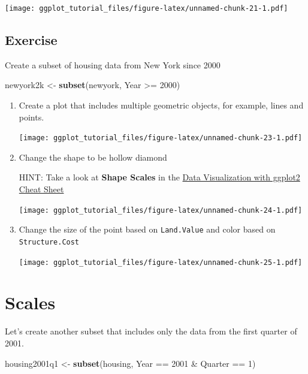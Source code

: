 \documentclass[]{article}
\newenvironment{Shaded}{\begin{snugshade}}{\end{snugshade}}
\newcommand{\KeywordTok}[1]{\textcolor[rgb]{0.13,0.29,0.53}{\textbf{{#1}}}}
\newcommand{\DecValTok}[1]{\textcolor[rgb]{0.00,0.00,0.81}{{#1}}}
\newcommand{\StringTok}[1]{\textcolor[rgb]{0.31,0.60,0.02}{{#1}}}
\newcommand{\NormalTok}[1]{{#1}}
\theoremstyle{definition}
\theoremstyle{definition}
\theoremstyle{definition}
\theoremstyle{remark}
\begin{document}
\texttt{[image: ggplot\_tutorial\_files/figure-latex/unnamed-chunk-21-1.pdf]}

\subsection{Exercise}\label{exercise-1}

Create a subset of housing data from New York since 2000

\begin{Shaded}
\begin{Highlighting}[]
\NormalTok{newyork2k <-}\StringTok{ }\KeywordTok{subset}\NormalTok{(newyork, Year >=}\StringTok{ }\DecValTok{2000}\NormalTok{)}
\end{Highlighting}
\end{Shaded}

\begin{enumerate}
\def\labelenumi{\arabic{enumi}.}
\item
  Create a plot that includes multiple geometric objects, for example,
  lines and points.

  \texttt{[image: ggplot\_tutorial\_files/figure-latex/unnamed-chunk-23-1.pdf]}
\item
  Change the shape to be hollow diamond

  HINT: Take a look at \textbf{Shape Scales} in the
  \href{https://www.rstudio.com/wp-content/uploads/2015/03/ggplot2-cheatsheet.pdf}{Data
  Visualization with ggplot2 Cheat Sheet}

  \texttt{[image: ggplot\_tutorial\_files/figure-latex/unnamed-chunk-24-1.pdf]}
\item
  Change the size of the point based on \texttt{Land.Value} and color
  based on \texttt{Structure.Cost}

  \texttt{[image: ggplot\_tutorial\_files/figure-latex/unnamed-chunk-25-1.pdf]}
\end{enumerate}

\section{Scales}\label{scales}

Let's create another subset that includes only the data from the first
quarter of 2001.

\begin{Shaded}
\begin{Highlighting}[]
\NormalTok{housing2001q1 <-}\StringTok{ }\KeywordTok{subset}\NormalTok{(housing, Year ==}\StringTok{ }\DecValTok{2001} \NormalTok{&}\StringTok{ }\NormalTok{Quarter ==}\StringTok{ }\DecValTok{1}\NormalTok{)}
\end{Highlighting}
\end{Shaded}
\end{document}
